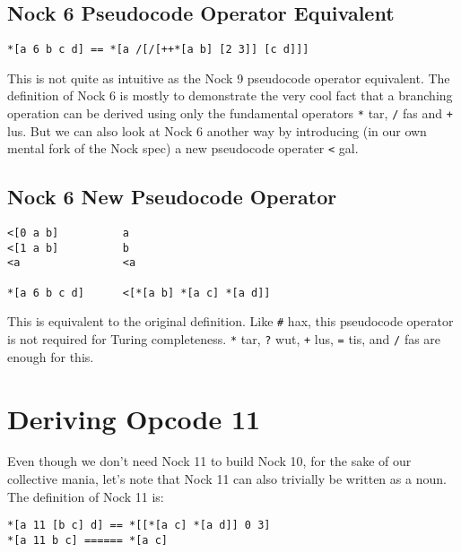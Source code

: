 \documentclass[twoside]{article}
\begin{document}
\subsection*{Nock 6 Pseudocode Operator Equivalent}

\begin{lstlisting}[style=listingcode]
*[a 6 b c d] == *[a /[/[++*[a b] [2 3]] [c d]]]
\end{lstlisting}

This is not quite as intuitive as the Nock 9 pseudocode operator equivalent. The definition of Nock 6 is mostly to demonstrate the very cool fact that a branching operation can be derived using only the fundamental operators \lstinline[style=inlinecode]{*} tar, \lstinline[style=inlinecode]{/} fas and \lstinline[style=inlinecode]{+} lus. But we can also look at Nock 6 another way by introducing (in our own mental fork of the Nock spec) a new pseudocode operater \lstinline[style=inlinecode]{<} gal.

\subsection*{Nock 6 New Pseudocode Operator}

\begin{lstlisting}[style=listingcode]
<[0 a b]          a
<[1 a b]          b
<a                <a

*[a 6 b c d]      <[*[a b] *[a c] *[a d]]
\end{lstlisting}

This is equivalent to the original definition. Like \lstinline[style=inlinecode]{#} hax, this pseudocode operator is not required for Turing completeness. \lstinline[style=inlinecode]{*} tar, \lstinline[style=inlinecode]{?} wut, \lstinline[style=inlinecode]{+} lus, \lstinline[style=inlinecode]{=} tis, and \lstinline[style=inlinecode]{/} fas are enough for this. 

\section{Deriving Opcode 11}

Even though we don't need Nock 11 to build Nock 10, for the sake of our collective mania, let's note that Nock 11 can also trivially be written as a noun. The definition of Nock 11 is:

\begin{lstlisting}[style=listingcode]
*[a 11 [b c] d] == *[[*[a c] *[a d]] 0 3]
*[a 11 b c] ====== *[a c]
\end{lstlisting}
\end{document}
